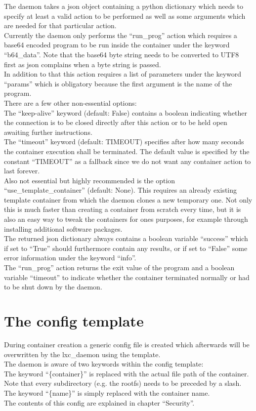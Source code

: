 The daemon takes a json object containing a python dictionary which needs to specify at least a valid action to
be performed as well as some arguments which are needed for that particular action.\\
Currently the daemon only performs the ``run\_prog'' action which requires a base64 encoded program to be run
inside the container under the keyword ``b64\_data''. Note that the base64 byte string needs to be converted to
UTF8 first as json complains when a byte string is passed.\\
In addition to that this action requires a list of parameters under the keyword ``params'' which is obligatory
because the first argument is the name of the program.\\
There are a few other non-essential options:\\
The ``keep-alive'' keyword (default: False) contains a boolean indicating whether the connection is to be closed
directly after this action or to be held open awaiting further instructions.\\
The ``timeout'' keyword (default: TIMEOUT) specifies after how many seconds the container execution shall be
terminated. The default value is specified by the constant ``TIMEOUT'' as a fallback since we do not want any
container action to last forever.\\
Also not essential but highly recommended is the option ``use\_template\_container'' (default: None). This
requires an already existing template container from which the daemon clones a new temporary one. Not only
this is much faster than creating a container from scratch every time, but it is also an easy way to tweak
the containers for ones purposes, for example through installing additional software packages.\\
The returned json dictionary always contains a boolean variable ``success'' which if set to ``True'' should
furthermore contain any results, or if set to ``False'' some error information under the keyword ``info''.\\
The ``run\_prog'' action returns the exit value of the program and a boolean variable ``timeout'' to indicate
whether the container terminated normally or had to be shut down by the daemon.

\section{The config template}

During container
creation a generic config file is created which afterwards will be overwritten by the lxc\_daemon using
the template.\\
The daemon is aware of two keywords within the config template:\\
The keyword ``\{container\}'' is replaced with the actual file path of the container. Note that every
subdirectory (e.g. the rootfs) needs to be preceded by a slash.\\
The keyword ``\{name\}'' is simply replaced with the container name.\\
The contents of this config are explained in chapter ``Security''.

